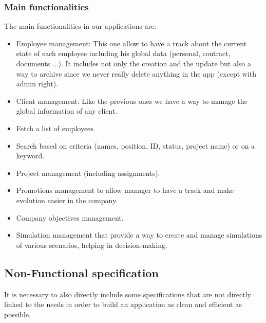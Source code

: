 \documentclass[12pt,a4paper,table,english]{article}
\begin{document}
	\subsubsection{Main functionalities}
	The main functionalities in our applications are:
	\begin{itemize}		
		\item Employee management: This one allow to have a track about the current state of each employee including his global data (personal, contract, documents ...). It includes not only the creation and the update but also a way to archive since we never really delete anything in the app (except with admin right).
		
		\item Client management: Like the previous ones we have a way to manage the global information of any client.
		
		\item Fetch a list of employees.
		
		\item Search based on criteria (names, position, ID, status, project name) or on a keyword.
		
		\item Project management (including assignments).
		
		\item Promotions management to allow manager to have a track and make evolution easier in the company.
		
		\item Company objectives management.
		
		\item Simulation management that provide a way to create and manage simulations of various scenarios, helping in decision-making.
		
	\end{itemize}


	\newpage
	
	\subsection{Non-Functional specification}
	
	It is necessary to also directly include some specifications that are not directly linked to the needs in order to build an application as clean and efficient as possible.
	
\end{document}

